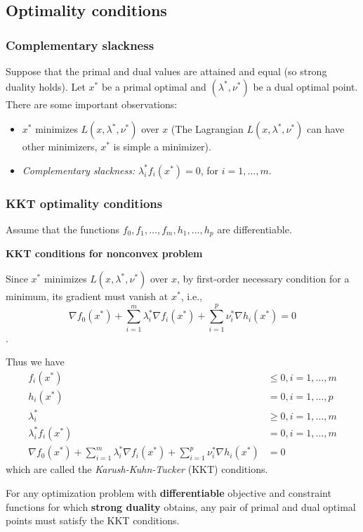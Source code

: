 \documentclass{article}
\begin{document}
\subsection{Optimality conditions}

\subsubsection{Complementary slackness}
Suppose that the primal and dual values are attained and equal (so strong duality holds). Let $x^*$ be a primal optimal and $(\lambda^*, \nu^*)$ be a dual optimal point. There are some important observations: 
\begin{itemize}
	\item $x^*$ minimizes $L(x,\lambda^*,\nu^*)$ over $x$ (The Lagrangian $L(x,\lambda^*, \nu^*)$ can have other minimizers, $x^*$ is simple a minimizer).
	\item \textit{Complementary slackness:} $\lambda_i^* f_i(x^*) = 0$, for $ i = 1, \ldots, m.$
\end{itemize}

\subsubsection {KKT optimality conditions}
Assume that the functions $f_0, f_1, \ldots, f_m, h_1, \ldots, h_p$ are differentiable. \newline

\textbf{KKT conditions for nonconvex problem}

Since $x^*$ minimizes $L(x,\lambda^*, \nu^*)$ over $x$, by first-order necessary condition for a minimum, its gradient must vanish at $x^*$, i.e.,
$$\nabla f_0(x^*) + \sum_{i=1}^m \lambda_i^* \nabla f_i(x^*) + \sum_{i=1}^p \nu_i^* \nabla h_i(x^*) = 0$$.

Thus we have
\begin{align*}
f_i(x^*) & \le 0, i = 1, \ldots, m\\
h_i(x^*) & = 0, i = 1, \ldots, p\\
\lambda_i^* & \ge 0, i = 1, \ldots, m\\
\lambda_i^* f_i(x^*) & = 0, i = 1, \ldots, m \\
\nabla f_0(x^*) + \sum_{i=1}^m \lambda_i^* \nabla f_i(x^*) + \sum_{i=1}^p \nu_i^* \nabla h_i(x^*) &= 0
\end{align*}
which are called the \textit{Karush-Kuhn-Tucker} (KKT) conditions. \newline

For any optimization problem with \textbf{differentiable} objective and constraint functions for which \textbf{strong duality} obtains, any pair of primal and dual optimal points must satisfy the KKT conditions.\newline
\end{document}
